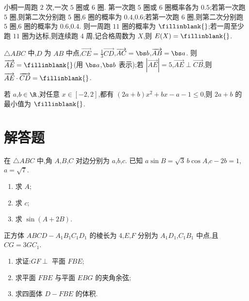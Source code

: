 \begin{problem}
小桐一周跑 \(2\) 次,一次 \(5\) 圈或 \(6\) 圈. 第一次跑 \(5\) 圈或 \(6\) 圈概率各为 \(0.5\);若第一次跑 \(5\) 圈,则第二次分别跑 \(5\) 圈,\(6\) 圈的概率为 \(0.4\),\(0.6\);若第一次跑 \(6\) 圈,则第二次分别跑 \(5\) 圈,\(6\) 圈的概率为 \(0.6\),\(0.4\).
则一周跑 \(11\) 圈的概率为 \(\fillinblank{}\);若一周至少跑 \(11\) 圈为达标,则连续跑 \(4\) 周,记合格周数为 \(X\),则 \(E(X)=\fillinblank{}\).
\end{problem}

\begin{problem}
\(\triangle ABC\) 中,\(D\) 为 \(AB\) 中点,\(\overrightarrow{CE}=\frac13\overrightarrow{CD}\),\(\overrightarrow{AC}= \bs b\),\(\overrightarrow{AB}=\bs a\).
则 \(\overrightarrow{AE}=\fillinblank{}\)(用 \(\bs a\),\(\bs b\) 表示);若 \(|\overrightarrow{AE}|=5\),\(\overrightarrow{AE}\perp\overrightarrow{CB}\),则 \(\overrightarrow{AE}\cdot\overrightarrow{CD}=\fillinblank{}\).

\end{problem}

\begin{problem}
若 \(a\),\(b\in\R\),对任意 \(x\in[-2,2]\),都有 \((2a+b)x^2+bx-a-1\le0\),则 \(2a+b\) 的最小值为 \(\fillinblank{}\).
\end{problem}

\section{解答题}

\begin{problem}
在 \(\triangle ABC\) 中,角 \(A\),\(B\),\(C\) 对边分别为 \(a\),\(b\),\(c\). 已知 \(a\sin B=\sqrt3\,b\cos A\),\(c-2b=1\),\(a=\sqrt7\).
\begin{enumerate}
    \item 求 \(A\);
    \item 求 \(c\);
    \item 求 \(\sin(A+2B)\).
\end{enumerate}
\end{problem}

\begin{problem}
正方体 \(ABCD-A_1B_1C_1D_1\) 的棱长为 4,\(E\),\(F\) 分别为 \(A_1D_1\),\(C_1B_1\) 中点,且 \(CG=3GC_1\).

\begin{enumerate}
\item 求证:\(GF\perp\) 平面 \(FBE\);
\item 求平面 \(FBE\) 与平面 \(EBG\) 的夹角余弦;
\item 求四面体 \(D-FBE\) 的体积.
\end{enumerate}

\end{problem}

